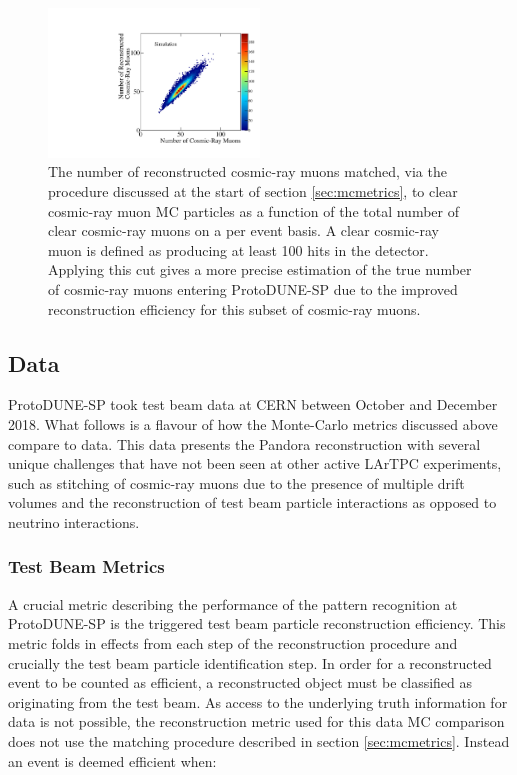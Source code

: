 \begin{figure}
\centering
\includegraphics[width=0.5\textwidth]{Figures/Metrics/MC/Cosmics/CRMatchesCosmicRayEvent.pdf}
\caption{The number of reconstructed cosmic-ray muons matched, via the procedure discussed at the start of section \ref{sec:mcmetrics}, to clear cosmic-ray muon MC particles as a function of the total number of clear cosmic-ray muons on a per event basis.  A clear cosmic-ray muon is defined as producing at least 100 hits in the detector.  Applying this cut gives a more precise estimation of the true number of cosmic-ray muons entering ProtoDUNE-SP due to the improved reconstruction efficiency for this subset of cosmic-ray muons.}
\label{fig:crnperevt}
\end{figure}

\subsection{Data}
\label{sec:data}
ProtoDUNE-SP took test beam data at CERN between October and December 2018.  What follows is a flavour of how the Monte-Carlo metrics discussed above compare to data.  This data presents the Pandora reconstruction with several unique challenges that have not been seen at other active LArTPC experiments, such as stitching of cosmic-ray muons due to the presence of multiple drift volumes and the reconstruction of test beam particle interactions as opposed to neutrino interactions.  

\subsubsection{Test Beam Metrics}
A crucial metric describing the performance of the pattern recognition at ProtoDUNE-SP is the triggered test beam particle reconstruction efficiency.  This metric folds in effects from each step of the reconstruction procedure and crucially the test beam particle identification step.  In order for a reconstructed event to be counted as efficient, a reconstructed object must be classified as originating from the test beam.  As access to the underlying truth information for data is not possible, the reconstruction metric used for this data MC comparison does not use the matching procedure described in section \ref{sec:mcmetrics}.  Instead an event is deemed efficient when:

